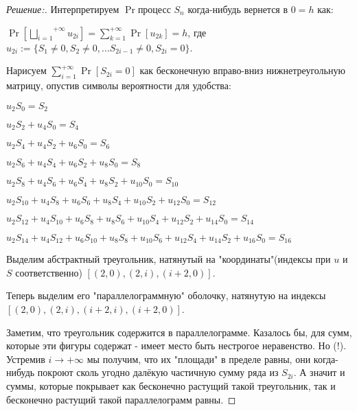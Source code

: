 \documentclass{article}
\begin{document}
        
        \begin{proof} [Решение:]
        
    Интерпретируем $\Pr {\text{процесс $S_n$ когда-нибудь вернется в $0$}} = h$ как:
    
    $\Pr [ \overset{+ \infty}{\underset{i = 1}\bigsqcup } u_{2i}] =$$\sum_{k=1}^{+ \infty} \Pr[u_{2k}]$$ = h $, где $u_{2i} := \{S_1 \neq 0, S_2 \neq 0, \dots S_{2i - 1} \neq 0, S_{2i} = 0\}$.
    
    \vspace{\baselineskip}
    
    Нарисуем $\sum_{i=1}^{+\infty} \Pr[S_{2i} = 0]$ как бесконечную вправо-вниз нижнетреугольную матрицу, опустив символы вероятности для удобства:
    
    $u_2 S_0 = S_2$ 
    
    $u_2 S_2 + u_4 S_0 = S_4$
    
    $u_2 S_4 + u_4 S_2 + u_6 S_0 = S_6$
    
    $u_2 S_6 + u_4 S_4 + u_6 S_2 + u_8 S_0 = S_8$
    
    $u_2 S_8 + u_4 S_6 + u_6 S_4 + u_8 S_2 + u_{10} S_0 = S_{10}$
    
    $u_2 S_{10} + u_4 S_8 + u_6 S_6 + u_8 S_4 + u_{10} S_2 + u_{12} S_0 = S_{12}$
    
    $u_2 S_{12} + u_4 S_{10} + u_6 S_8 + u_8 S_6 + u_{10} S_4  + u_{12} S_2 + u_{14} S_0 = S_{14}$
    
    $u_2 S_{14} + u_4 S_{12} + u_6 S_{10} + u_8 S_8 + u_{10} S_6 + u_{12} S_4 + u_{14} S_2 + u_{16} S_0 = S_{16} $
    
    \cdots \cdots \cdots \cdots \cdots \cdots \cdots \cdots \cdots \cdots \cdots \cdots
    \cdots \cdots \cdots \cdots \cdots \cdots
    \cdots \cdots \cdots \cdots \cdots \cdots
    
    \vspace{\baselineskip}
    
    Выделим абстрактный треугольник, натянутый на "координаты"(индексы при $u$ и $S$ соответственно) $[(2, 0), (2, i), (i+2, 0)]$.
    
    Теперь выделим его "параллелограммную" оболочку, натянутую на индексы $[(2, 0), (2, i), (i+2, i), (i+2, 0)]$.
    
    Заметим, что треугольник содержится в параллелограмме. Казалось бы, для сумм, которые эти фигуры содержат - имеет место быть нестрогое неравенство. Но (!). Устремив $i \rightarrow + \infty$ мы получим, что их "площади" в пределе равны, они когда-нибудь покроют сколь угодно далёкую частичную сумму ряда из $S_{2i}$. А значит и суммы, которые покрывает как бесконечно растущий такой треугольник, так и бесконечно растущий такой параллелограмм равны.
    

\end{proof}
\end{document}
